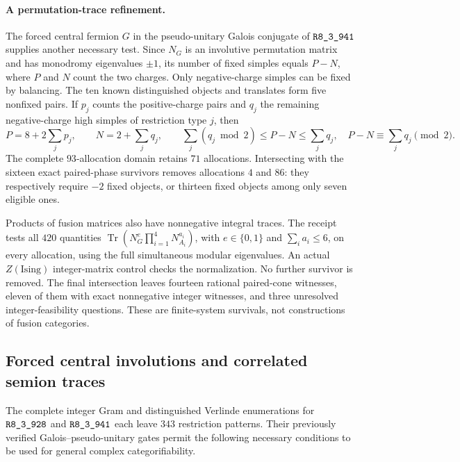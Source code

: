 \paragraph{A permutation-trace refinement.}
The forced central fermion $G$ in the pseudo-unitary Galois conjugate of
$\sha{R8_3_941}$ supplies another necessary test.  Since $N_G$ is an
involutive permutation matrix and has monodromy eigenvalues $\pm1$, its
number of fixed simples equals $P-N$, where $P$ and $N$ count the two
charges.  Only negative-charge simples can be fixed by balancing.
The ten known distinguished objects and translates form five nonfixed
pairs.  If $p_j$ counts the positive-charge pairs and $q_j$ the remaining
negative-charge high simples of restriction type $j$, then
\[
 P=8+2\sum_jp_j,\qquad N=2+\sum_jq_j,
 \qquad
 \sum_j(q_j\bmod2)\le P-N\le\sum_jq_j,
 \quad P-N\equiv\sum_jq_j\pmod2.
\]
The complete $93$-allocation domain retains $71$ allocations.  Intersecting
with the sixteen exact paired-phase survivors removes allocations $4$
and $86$: they respectively require $-2$ fixed objects, or thirteen
fixed objects among only seven eligible ones.

Products of fusion matrices also have nonnegative integral traces.  The
receipt tests all $420$ quantities
$\operatorname{Tr}(N_G^e\prod_{i=1}^4N_{A_i}^{a_i})$, with
$e\in\{0,1\}$ and $\sum_i a_i\le6$, on every allocation, using the
full simultaneous modular eigenvalues.  An actual $Z(\mathrm{Ising})$
integer-matrix control checks the normalization.  No further survivor is
removed.  The final intersection leaves fourteen rational paired-cone
witnesses, eleven of them with exact nonnegative integer witnesses, and
three unresolved integer-feasibility questions.  These are finite-system
survivals, not constructions of fusion categories.

\subsection{Forced central involutions and correlated semion traces}
\label{subsec:frontier-quartic-semion}

The complete integer Gram and distinguished Verlinde enumerations for
$\sha{R8_3_928}$ and $\sha{R8_3_941}$ each leave $343$ restriction patterns.
Their previously verified Galois--pseudo-unitary gates permit the following
necessary conditions to be used for general complex categorifiability.

